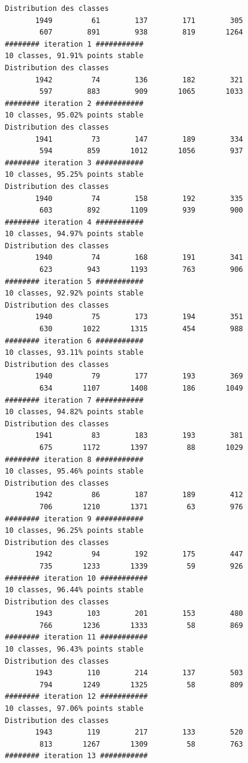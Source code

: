 \documentclass[environments,article,submit,pdftex,moreauthors]{Definitions/mdpi}
\begin{document}
\begin{scriptsize}
\begin{verbatim}
Distribution des classes
       1949         61        137        171        305
        607        891        938        819       1264
######## iteration 1 ###########
10 classes, 91.91% points stable
Distribution des classes
       1942         74        136        182        321
        597        883        909       1065       1033
######## iteration 2 ###########
10 classes, 95.02% points stable
Distribution des classes
       1941         73        147        189        334
        594        859       1012       1056        937
######## iteration 3 ###########
10 classes, 95.25% points stable
Distribution des classes
       1940         74        158        192        335
        603        892       1109        939        900
######## iteration 4 ###########
10 classes, 94.97% points stable
Distribution des classes
       1940         74        168        191        341
        623        943       1193        763        906
######## iteration 5 ###########
10 classes, 92.92% points stable
Distribution des classes
       1940         75        173        194        351
        630       1022       1315        454        988
######## iteration 6 ###########
10 classes, 93.11% points stable
Distribution des classes
       1940         79        177        193        369
        634       1107       1408        186       1049
######## iteration 7 ###########
10 classes, 94.82% points stable
Distribution des classes
       1941         83        183        193        381
        675       1172       1397         88       1029
######## iteration 8 ###########
10 classes, 95.46% points stable
Distribution des classes
       1942         86        187        189        412
        706       1210       1371         63        976
######## iteration 9 ###########
10 classes, 96.25% points stable
Distribution des classes
       1942         94        192        175        447
        735       1233       1339         59        926
######## iteration 10 ###########
10 classes, 96.44% points stable
Distribution des classes
       1943        103        201        153        480
        766       1236       1333         58        869
######## iteration 11 ###########
10 classes, 96.43% points stable
Distribution des classes
       1943        110        214        137        503
        794       1249       1325         58        809
######## iteration 12 ###########
10 classes, 97.06% points stable
Distribution des classes
       1943        119        217        133        520
        813       1267       1309         58        763
######## iteration 13 ###########

\end{verbatim}
\end{scriptsize}
\end{document}
